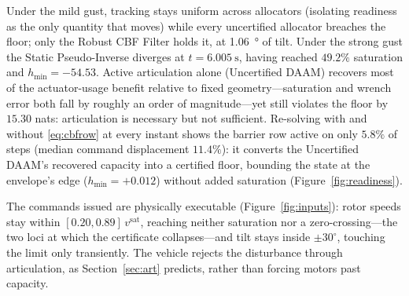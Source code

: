 \documentclass[letter, 10 pt, journal, twoside]{IEEEtran}
\theoremstyle{compact}
\begin{document}
Under the mild gust, tracking stays uniform across allocators (isolating readiness as the only quantity that moves) while every uncertified allocator breaches the floor; only the Robust \ac{CBF} Filter holds it, at \SI{1.06}{\degree} of tilt. Under the strong gust the Static Pseudo-Inverse diverges at $t=\SI{6.005}{\second}$, having reached $49.2\%$ saturation and $h_{\min}=-54.53$. Active articulation alone (Uncertified \ac{DAAM}) recovers most of the actuator-usage benefit relative to fixed geometry---saturation and wrench error both fall by roughly an order of magnitude---yet still violates the floor by $15.30$ nats: articulation is necessary but not sufficient. Re-solving with and without \eqref{eq:cbfrow} at every instant shows the barrier row active on only $5.8\%$ of steps (median command displacement  $11.4\%$): it converts the Uncertified \ac{DAAM}'s recovered capacity into a certified floor, bounding the state at the envelope's edge ($h_{\min}=+0.012$) without added saturation (Figure~\ref{fig:readiness}).

The commands issued are physically executable (Figure~\ref{fig:inputs}): rotor speeds stay within $[0.20,0.89]\,v^{\mathrm{sat}}$, reaching neither saturation nor a zero-crossing---the two loci at which the certificate collapses---and tilt stays inside $\pm30^\circ$, touching the limit only transiently. The vehicle rejects the disturbance through articulation, as Section~\ref{sec:art} predicts, rather than forcing motors past capacity.
 
\end{document}
